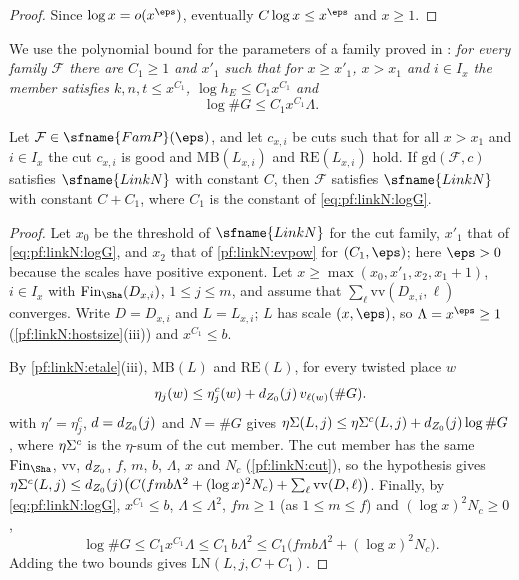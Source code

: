 \begin{proof}
Since $\log x=o(x^\eps)$, eventually $C\log x\le x^\eps$ and $x\ge1$.
\end{proof}

We use the polynomial bound for the parameters of a family proved in
: \emph{for every family $\mathcal F$ there are $C_1\ge1$ and
$x'_1$ such that for $x\ge x'_1$, $x>x_1$ and $i\in I_x$ the member satisfies $k,n,t\le x^{C_1}$, $\log h_E\le C_1x^{C_1}$ and}
\begin{equation}\label{eq:pf:linkN:logG}
\log\#G\le C_1x^{C_1}\Lambda .
\end{equation}

\begin{proposition}\label{pf:linkN:return}
Let $\mathcal F\in\sfname{FamP}(\eps)$, and let $c_{x,i}$ be cuts such that for all $x>x_1$ and $i\in I_x$ the cut $c_{x,i}$ is
good and $\mathrm{MB}(L_{x,i})$ and $\mathrm{RE}(L_{x,i})$ hold. If $\mathrm{gd}(\mathcal F,c)$ satisfies $\sfname{LinkN}$ with
constant $C$, then $\mathcal F$ satisfies $\sfname{LinkN}$ with constant $C+C_1$, where $C_1$ is the constant of
\eqref{eq:pf:linkN:logG}.
\end{proposition}

\begin{proof}
Let $x_0$ be the threshold of $\sfname{LinkN}$ for the cut family, $x'_1$ that of \eqref{eq:pf:linkN:logG}, and $x_2$ that of
\cref{pf:linkN:evpow} for $(C_1,\eps)$; here $\eps>0$ because the scales have positive exponent. Let
$x\ge\max(x_0,x'_1,x_2,x_1+1)$, $i\in I_x$ with $\linkNfin(D_{x,i})$, $1\le j\le m$, and assume that
$\sum_\ell\mathrm{vv}(D_{x,i},\ell)$ converges. Write $D=D_{x,i}$ and $L=L_{x,i}$; $L$ has scale $(x,\eps)$, so $\Lambda=x^\eps\ge1$
(\cref{pf:linkN:hostsize}(iii))
and $x^{C_1}\le b$.

By \cref{pf:linkN:etale}(iii), $\mathrm{MB}(L)$ and $\mathrm{RE}(L)$, for every twisted place $w$
\[
\eta_j(w)\le\eta^c_j(w)+d_{Z_0}(j)\,v_{\ell(w)}(\#G).
\]
 with $\eta'=\eta^c_j$, $d=d_{Z_0}(j)$ and $N=\#G$ gives $\eta\Sigma(L,j)\le\eta\Sigma^c(L,j)+d_{Z_0}(j)\log\#G$,
where $\eta\Sigma^c$ is the $\eta$-sum of the cut member. The cut member has the same $\linkNfin$, $\mathrm{vv}$, $d_{Z_0}$, $f$, $m$,
$b$, $\Lambda$, $x$ and $N_c$ (\cref{pf:linkN:cut}), so the hypothesis gives
$\eta\Sigma^c(L,j)\le d_{Z_0}(j)\bigl(C(fmb\Lambda^2+(\log x)^2N_c)+\sum_\ell\mathrm{vv}(D,\ell)\bigr)$. Finally, by
\eqref{eq:pf:linkN:logG}, $x^{C_1}\le b$, $\Lambda\le\Lambda^2$, $fm\ge1$ (as $1\le m\le f$) and $(\log x)^2N_c\ge0$,
\[
\log\#G\le C_1x^{C_1}\Lambda\le C_1\,b\Lambda^2\le C_1\bigl(fmb\Lambda^2+(\log x)^2N_c\bigr).
\]
Adding the two bounds gives $\mathrm{LN}(L,j,C+C_1)$.
\end{proof}

